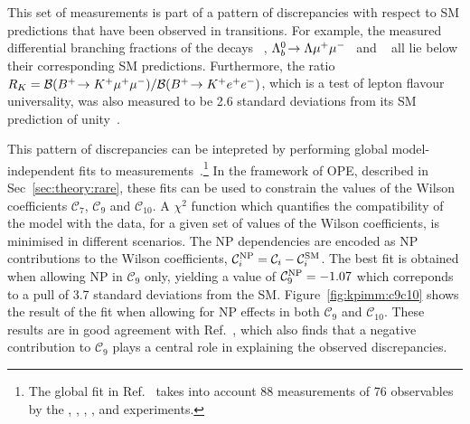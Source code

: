 This set of measurements is part of a pattern of discrepancies with respect to SM predictions that have been observed in \btosmm transitions. For example, the measured differential branching fractions of the decays \BsTophimm~\cite{LHCB-PAPER-2015-023}, ${{\Lambda}^0_{b}}\!\rightarrow \Lambda{\ensuremath{\mu^+\mu^-}}$~\cite{LHCB-PAPER-2015-009} and \BuToKmm~\cite{LHCB-PAPER-2014-006} all lie below their corresponding SM predictions. Furthermore, the ratio $R_{K} = {\mathcal{B}}({{{B}^+}}\!\rightarrow {\ensuremath{{K}^+}}{\ensuremath{\mu^+}}{\ensuremath{\mu^-}})/{\mathcal{B}}({{{B}^+}}\!\rightarrow {\ensuremath{{K}^+}}{\ensuremath{e^+}}{\ensuremath{e^-}})$, which is a test of lepton flavour universality, was also measured to be 2.6 standard deviations from its SM prediction of unity~\cite{LHCB-PAPER-2014-024}.

This pattern of discrepancies can be intepreted by performing global model-independent fits to \btosmm measurements~\cite{Altmannshofer:2015sma}.{\footnote{The global fit in Ref.~\cite{Altmannshofer:2015sma} takes into account 88 measurements of 76 observables by the \atlas, \babar, \belle, \cdf, \cms and \lhcb experiments.}} In the framework of OPE, described in Sec~\ref{sec:theory:rare}, these fits can be used to constrain the values of the Wilson coefficients $\mathcal{C}_{7}$, $\mathcal{C}_{9}$ and $\mathcal{C}_{10}$. A $\chi^{2}$ function which quantifies the compatibility of the model with the data, for a given set of values of the Wilson coefficients, is minimised in different scenarios. The NP dependencies are encoded as NP contributions to the Wilson coefficients, $\mathcal{C}_{i}^{\rm NP} = \mathcal{C}_{i}-\mathcal{C}_{i}^{\rm SM}$. The best fit is obtained when allowing NP in $\mathcal{C}_{9}$ only, yielding a value of $\mathcal{C}_{9}^{\rm NP} = -1.07$ which correponds to a pull of 3.7 standard deviations from the SM. Figure~\ref{fig:kpimm:c9c10} shows the result of the fit when allowing for NP effects in both $\mathcal{C}_{9}$ and $\mathcal{C}_{10}$. These results are in good agreement with Ref.~\cite{Descotes-Genon:2015uva}, which also finds that a negative contribution to $\mathcal{C}_{9}$ plays a central role in explaining the observed discrepancies.

